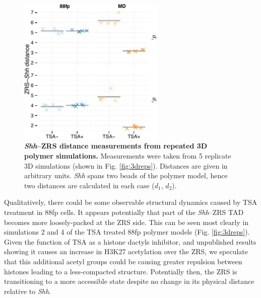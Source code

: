 \documentclass[a4paper,11pt,oneside]{book}
\begin{document}
\begin{figure}
\begin{center} 
\includegraphics[width=2.75in]{figs/3d_dists.pdf}
\captionsetup{width=\textwidth} 
\caption[ \emph{Shh}--ZRS distance measurements from repeated 3D polymer simulations. ]{ {\bf \emph{Shh}--ZRS distance measurements from repeated 3D polymer simulations. }
Measurements were taken from 5 replicate 3D simulations (shown in Fig. \ref{fig:3dreps}). Distances are given in arbitrary units. \emph{Shh} spans two beads of the polymer model, hence two distances are calculated in each case ($d_1$, $d_2$).
}\label{fig:3ddist}
\end{center} 
\end{figure} 

Qualitatively, there could be some observable structural dynamics caused by TSA treatment in 88fp cells. It appears potentially that part of the \emph{Shh}--ZRS TAD becomes more loosely-packed at the ZRS side. This can be seen most clearly in simulations 2 and 4 of the TSA treated 88fp polymer models (Fig. \ref{fig:3dreps}). Given the function of TSA as a histone dactyls inhibitor, and unpublished results showing it causes an increase in H3K27 acetylation over the ZRS, we speculate that this additional acetyl groups could be causing greater repulsion between histones leading to a less-compacted structure. Potentially then, the ZRS is transitioning to a more accessible state despite no change in its physical distance relative to \emph{Shh}.


\end{document}
